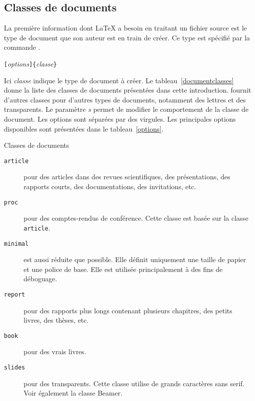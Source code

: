 \subsection {Classes de documents}\label{sec:documentclass}

La première information dont \LaTeX{} a besoin en traitant un fichier
source est le type de document que son auteur est en train de
créer. Ce type est spécifié par la commande .
\begin{lscommand}
\verb|[|\emph{options}\verb|]{|\emph{classe}\verb|}|
\end{lscommand}
Ici \emph{classe} indique le type de document à créer. Le
tableau~\ref{documentclasses} donne la liste des classes de documents
présentées dans cette introduction. \LaTeXe{} fournit d'autres classes
pour d'autres types de documents, notamment des lettres et des
transparents. Le paramètre \emph{s} permet de modifier le
comportement de la classe de document. Les options sont séparées par
des virgules. Les principales options disponibles sont présentées dans
le tableau~\ref{options}.


\begin{table}[!bp]
\caption{Classes de documents} \label{documentclasses}
\begin{lined}{\textwidth}
\begin{description}

\item [\normalfont\texttt{article}] pour des articles dans des revues
      scientifiques, des présentations, des rapports courts, des
      documentations, des invitations, etc.
\item [\normalfont\texttt{proc}] pour des comptes-rendus de conférence.
  Cette classe est basée sur la classe \texttt{article}.
\item [\normalfont\texttt{minimal}] est aussi réduite que
  possible. Elle définit uniquement une taille de papier et une police
  de base. Elle est utilisée principalement à des fins de déboguage.
\item [\normalfont\texttt{report}] pour des rapports plus longs
      contenant plusieurs chapitres, des petits livres, des thèses, etc.
\item [\normalfont\texttt{book}] pour des vrais livres.
\item [\normalfont\texttt{slides}] pour des transparents. Cette classe
      utilise de grands caractères sans serif. Voir également la
      classe Beamer.
\end{description}
\end{lined}
\end{table}

